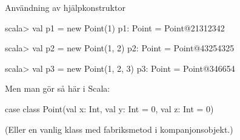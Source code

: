 \begin{Slide}{Användning av hjälpkonstruktor}
\begin{REPL}
scala> val p1 = new Point(1)
p1: Point = Point@21312342

scala> val p2 = new Point(1, 2)
p2: Point = Point@43254325

scala> val p3 = new Point(1, 2, 3)
p3: Point = Point@346654
\end{REPL}
\pause
Men man gör  så här i Scala:
\begin{Code}[basicstyle=\ttfamily\SlideFontSize{8.5}{12}]
case class Point(val x: Int, val y: Int = 0, val z: Int = 0)
\end{Code}
(Eller en vanlig klass med fabriksmetod i kompanjonsobjekt.)
\end{Slide}



%
%
%
%
%



